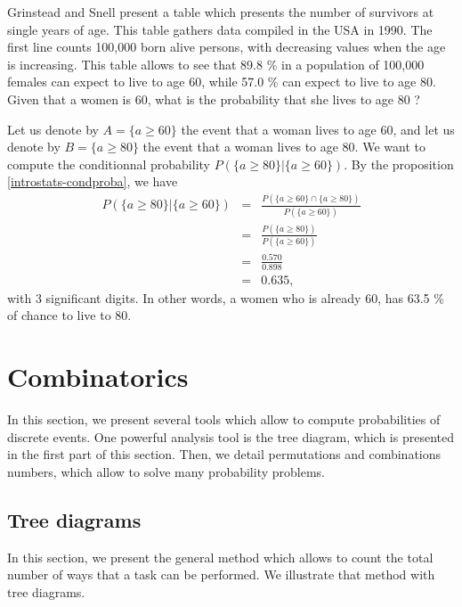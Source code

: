 \begin{example}
Grinstead and Snell \cite{introprobasGrinsteadSnell} present a table 
which presents the number of survivors at single years of age.
This table gathers data compiled in the USA in 1990.
The first line counts 100,000 born alive persons, with decreasing 
values when the age is increasing. This table allows to 
see that 89.8 \% in a population of 100,000 females can expect to 
live to age 60, while 57.0 \% can expect to live to age 80. Given
that a women is 60, what is the probability that she lives 
to age 80 ?

Let us denote by $A=\{a\geq 60\}$ the event that a woman lives to age 60, 
and let us denote by $B=\{a\geq 80\}$ the event that a woman lives to age 80.
We want to compute the conditionnal probability $P(\{a\geq 80\} | \{a\geq 60\})$. 
By the proposition \ref{introstats-condproba}, we have
\begin{eqnarray}
P(\{a\geq 80\} | \{a\geq 60\}) 
&=& \frac{P(\{a\geq 60\}\cap \{a\geq 80\})}{P(\{a\geq 60\})}\\
&=& \frac{P(\{a\geq 80\})}{P(\{a\geq 60\})}\\
&=& \frac{0.570}{0.898}\\
&=&0.635,
\end{eqnarray}
with 3 significant digits.
In other words, a women who is already 60, has 63.5 \% of chance 
to live to 80.
\end{example}


\section{Combinatorics}
\label{introstats-chap-combinatorics}

In this section, we present several tools which allow to compute 
probabilities of discrete events. One powerful analysis tool is 
the tree diagram, which is presented in the first part of this section.
Then, we detail permutations and combinations numbers,
which allow to solve many probability problems.

\subsection{Tree diagrams}

In this section, we present the general method which allows to count 
the total number of ways that a task can be performed. We illustrate that
method with tree diagrams.

